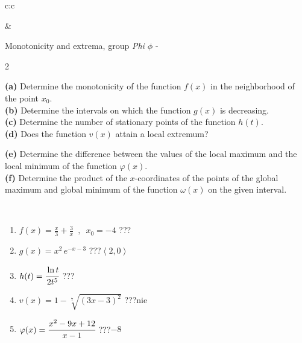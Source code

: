 \documentclass[10pt]{report}
\begin{document}
\begin{tabular}{c:c}
\begin{minipage}[c][104.5mm][t]{0.5\linewidth}
\end{minipage}
&
\begin{minipage}[c][104.5mm][t]{0.5\linewidth}
\begin{center}
\vspace{5mm}
{\huge Monotonicity and extrema, group \textit{Phi $\phi$} -}\\[5mm]
\begin{minipage}{0.95\linewidth}
\begin{center}
{\small \begin{multicols}{2} \raggedright
\textbf{(a)} Determine the monotonicity of the function \(f(x)\) in the neighborhood of the point \(x_0\). \\[1mm]
\textbf{(b)} Determine the intervals on which the function \(g(x)\) is decreasing. \\[1mm]
\textbf{(c)} Determine the number of stationary points of the function \(h(t)\). \\[1mm]
\textbf{(d)} Does the function \(v(x)\) attain a local extremum? \par \columnbreak
\textbf{(e)} Determine the difference between the values of the local maximum and the local minimum of the function \(\varphi(x)\). \\[1mm]
\textbf{(f)} Determine the product of the \(x\)-coordinates of the points of the global maximum and global minimum of the function \(\omega(x)\) on the given interval. \\[1mm]
\end{multicols}
}
\end{center}
\end{minipage}
\\[1mm]
\begin{minipage}{0.79\linewidth}
\begin{center}
\begin{varwidth}{\linewidth}
\setlength{\itemsep}{0pt}
\begin{enumerate}
\normalsize
\item $f(x)=\frac{x}{3}+\frac{3}{x} \enspace , \enspace x_0=-4$\quad \dotfill\; ???\;\dotfill \quad {}
\item $g(x)=x^2\, e^{-x-3}$\quad \dotfill\; ???\;\dotfill \quad $\left\langle2 , 0\right\rangle$
\item $h(t)=\cfrac{\ln t}{2t^5}$\quad \dotfill\; ???\;\dotfill {}
\item $v(x)=1-\sqrt[7]{(3x-3)^2}$\quad \dotfill\; ???\;\dotfill \quad $\text{nie}$
\item $\varphi(x)=\cfrac{x^2-9x+12}{x-1}$\quad \dotfill\; ???\;\dotfill \quad $-8$

\end{enumerate}
\end{varwidth}
\end{center}
\end{minipage}
\end{center}
\end{minipage}
\end{tabular}
\end{document}

